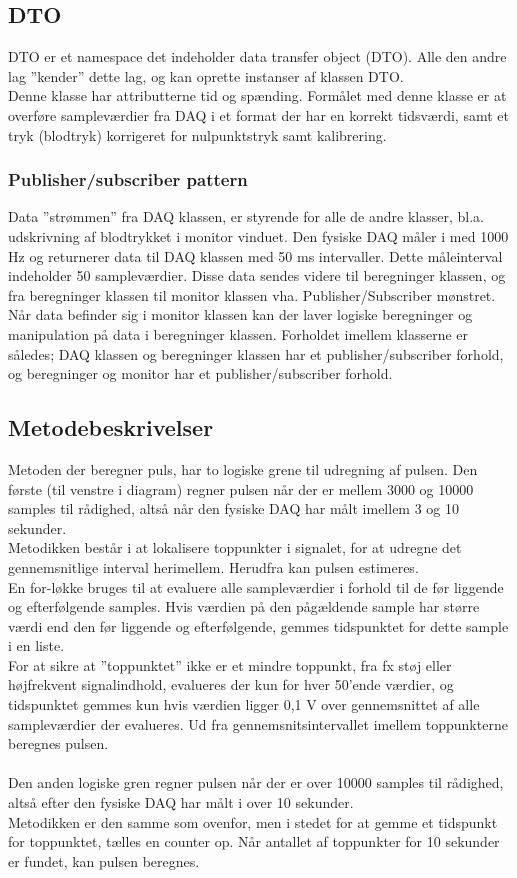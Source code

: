 \subsection{DTO}
DTO er et namespace det indeholder data transfer object (DTO). Alle den andre lag ”kender” dette lag, og kan oprette instanser af klassen DTO.\\
Denne klasse har attributterne tid og spænding. Formålet med denne klasse er at overføre sampleværdier fra DAQ i et format der har en korrekt tidsværdi, samt et tryk (blodtryk) korrigeret for nulpunktstryk samt kalibrering.

\subsubsection{Publisher/subscriber pattern}
Data ”strømmen” fra DAQ klassen, er styrende for alle de andre klasser, bl.a. udskrivning af blodtrykket i monitor vinduet. Den fysiske DAQ måler i med 1000 Hz og returnerer data til DAQ klassen med 50 ms intervaller. Dette måleinterval indeholder 50 sampleværdier. Disse data sendes videre til beregninger klassen, og fra beregninger klassen til monitor klassen vha. Publisher/Subscriber mønstret. Når data befinder sig i monitor klassen kan der laver logiske beregninger og manipulation på data i beregninger klassen.
Forholdet imellem klasserne er således; DAQ klassen og beregninger klassen har et publisher/subscriber forhold, og  beregninger og monitor har et publisher/subscriber forhold.

\subsection{Metodebeskrivelser}
Metoden der beregner puls, har to logiske grene til udregning af pulsen. Den første (til venstre i diagram) regner pulsen når der er mellem 3000 og 10000 samples til rådighed, altså når den fysiske DAQ har målt imellem 3 og 10 sekunder.\\
Metodikken består i at lokalisere toppunkter i signalet, for at udregne det gennemsnitlige interval herimellem. Herudfra kan pulsen estimeres. \\
En for-løkke bruges til at evaluere alle sampleværdier i forhold til de før liggende og efterfølgende samples. Hvis værdien på den pågældende sample har større værdi end den før liggende og efterfølgende, gemmes tidspunktet for dette sample i en liste.\\ 
For at sikre at ”toppunktet” ikke er et mindre toppunkt, fra fx støj eller højfrekvent signalindhold, evalueres der kun for hver 50'ende værdier, og tidspunktet gemmes kun hvis værdien ligger 0,1 V over gennemsnittet af alle sampleværdier der evalueres. Ud fra gennemsnitsintervallet imellem toppunkterne beregnes pulsen.
\\
\\
Den anden logiske gren regner pulsen når der er over 10000 samples til rådighed, altså efter den fysiske DAQ har målt i over 10 sekunder.\\ 
Metodikken er den samme som ovenfor, men i stedet for at gemme et tidspunkt for toppunktet, tælles en counter op. Når antallet af toppunkter for 10 sekunder er fundet, kan pulsen beregnes.

